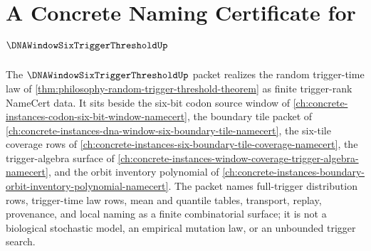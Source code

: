 \chapter{A Concrete Naming Certificate for $\DNAWindowSixTriggerThresholdUp$}
\label{ch:concrete-instances-dna-window-six-trigger-threshold-namecert}

The $\DNAWindowSixTriggerThresholdUp$ packet realizes the random trigger-time
law of \autoref{thm:philosophy-random-trigger-threshold-theorem} as finite
trigger-rank NameCert data. It sits beside the six-bit codon source window of
\autoref{ch:concrete-instances-codon-six-bit-window-namecert}, the boundary
tile packet of \autoref{ch:concrete-instances-dna-window-six-boundary-tile-namecert},
the six-tile coverage rows of
\autoref{ch:concrete-instances-six-boundary-tile-coverage-namecert}, the
trigger-algebra surface of
\autoref{ch:concrete-instances-window-coverage-trigger-algebra-namecert}, and
the orbit inventory polynomial of
\autoref{ch:concrete-instances-boundary-orbit-inventory-polynomial-namecert}.
The packet names full-trigger distribution rows, trigger-time law rows, mean
and quantile tables, transport, replay, provenance, and local naming as a
finite combinatorial surface; it is not a biological stochastic model, an
empirical mutation law, or an unbounded trigger search.

